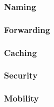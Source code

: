 \subsubsection{Naming}

\subsubsection{Forwarding}

\subsubsection{Caching}

\subsubsection{Security}

\subsubsection{Mobility}


